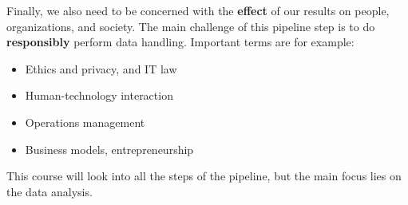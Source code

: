 Finally, we also need to be concerned with the \textbf{effect} of our results on people, organizations, and society. The main challenge of this pipeline step is to do \textbf{responsibly} perform data handling. Important terms are for example:
\begin{itemize}
  \item Ethics and privacy, and IT law
  \item Human-technology interaction
  \item Operations management
  \item Business models, entrepreneurship
\end{itemize}

This course will look into all the steps of the pipeline, but the main focus lies on the data analysis.